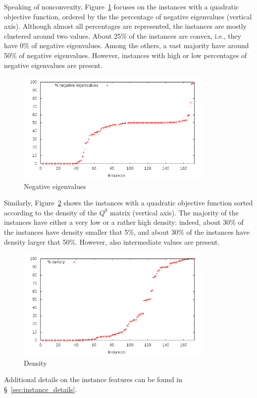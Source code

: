 Speaking of nonconvexity, Figure~\ref{fig:pic_neg_eig} focuses on
the instances with a quadratic objective function, ordered by the
the percentage of negative eigenvalues (vertical axis). Although
almost all percentages are represented, the instances are mostly
clustered around two values. About 25\% of the instances are convex,
i.e., they have 0\% of negative eigenvalues. Among the others, a vast
majority have around 50\% of negative eigenvalues. However, instances
with high or low percentages of negative eigenvalues are present.

\begin{figure}\centering
  \includegraphics[width=0.85\textwidth]{pic_neg_eig.png}
  \caption{Negative eigenvalues \label{fig:pic_neg_eig}}
\end{figure}

Similarly, Figure~\ref{fig:pic_density} shows the instances with a
quadratic objective function sorted according to the density of the
$Q^0$ matrix (vertical axis). The majority of the instances have either
a very low or a rather high density: indeed, about 30\% of the instances
have density smaller that 5\%, and about 30\% of the instances have
density larger that 50\%. However, also intermediate values are present. 

\begin{figure}\centering
  \includegraphics[width=0.85\textwidth]{pic_density.png}
  \caption{Density \label{fig:pic_density}}
\end{figure}


Additional details on the instance features can be found in \S~\ref{sec:instance_details}.
